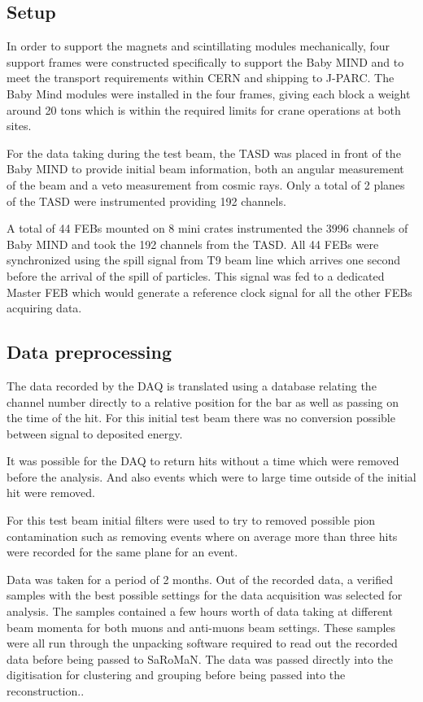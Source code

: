 \subsection{Setup}

In order to support the magnets and scintillating modules mechanically, four support frames were constructed specifically to support the Baby MIND and  to meet the transport requirements within CERN and shipping to J-PARC. The Baby Mind modules were installed in the four frames, giving each block a weight around 20 tons which is within the required limits for crane operations at both sites.

For the data taking during the test beam, the TASD was placed in front of the Baby MIND to provide initial beam information, both an angular measurement of the beam and a veto measurement from cosmic rays. Only a total of 2 planes of the TASD were instrumented providing 192 channels. 

A total of 44 FEBs mounted on 8 mini crates instrumented the 3996 channels of Baby MIND and took the 192 channels from the TASD. All 44 FEBs were synchronized using the spill signal from T9 beam line which arrives one second before the arrival of the spill of particles. This signal was fed to a dedicated Master FEB which would generate a reference clock signal for all the other FEBs acquiring data.

\subsection{Data preprocessing}
The data recorded by the DAQ is translated using a database relating the channel number directly to a relative position for the bar as well as passing on the time of the hit. For this initial test beam there was no conversion possible between signal to deposited energy.

It was possible for the DAQ to return hits without a time which were removed before the analysis. And also events which were to large time outside of the initial hit were removed.

For this test beam initial filters were used to try to removed possible pion contamination such as removing events where on average more than three hits were recorded for the same plane for an event. 

Data was taken for a period of 2 months. Out of the recorded data, a verified samples with the best possible settings for the data acquisition was selected for analysis. The samples contained a few hours worth of data taking at different beam momenta for both muons and anti-muons beam settings. These samples were all run through the unpacking software required to read out the recorded data before being passed to SaRoMaN. The data was passed directly into the digitisation for clustering and grouping before being passed into the reconstruction..

